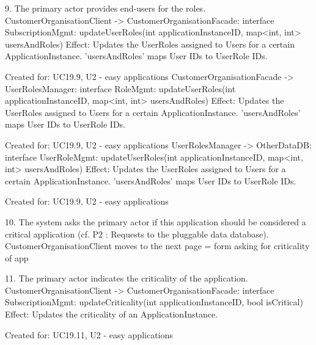 {{{            9. The primary actor provides end-users for the roles.
                    CustomerOrganisationClient -> CustomerOrganisationFacade: interface SubscriptionMgmt: updateUserRoles(int applicationInstanceID, map<int, int> usersAndRoles)
                        Effect: Updates the UserRoles assigned to Users for a certain ApplicationInstance. 'usersAndRoles' maps User IDs to UserRole IDs.
                        \item Created for: UC19.9, U2 - easy applications
                    CustomerOrganisationFacade -> UserRolesManager:           interface RoleMgmt:         updateUserRoles(int applicationInstanceID, map<int, int> usersAndRoles)
                        Effect: Updates the UserRoles assigned to Users for a certain ApplicationInstance. 'usersAndRoles' maps User IDs to UserRole IDs.
                        \item Created for: UC19.9, U2 - easy applications
                    UserRolesManager -> OtherDataDB:                          interface UserRoleMgmt:     updateUserRoles(int applicationInstanceID, map<int, int> usersAndRoles)
                        Effect: Updates the UserRoles assigned to Users for a certain ApplicationInstance. 'usersAndRoles' maps User IDs to UserRole IDs.
                        \item Created for: UC19.9, U2 - easy applications

            10. The system asks the primary actor if this application should be considered a critical application (cf. P2 : Requests to the pluggable data database).
                    CustomerOrganisationClient moves to the next page = form asking for criticality of app

            11. The primary actor indicates the criticality of the application.
                    CustomerOrganisationClient -> CustomerOrganisationFacade: interface SubscriptionMgmt: updateCriticality(int applicationInstanceID, bool isCritical)
                        Effect: Updates the criticality of an ApplicationInstance.
                        \item Created for: UC19.11, U2 - easy applications

}}}
